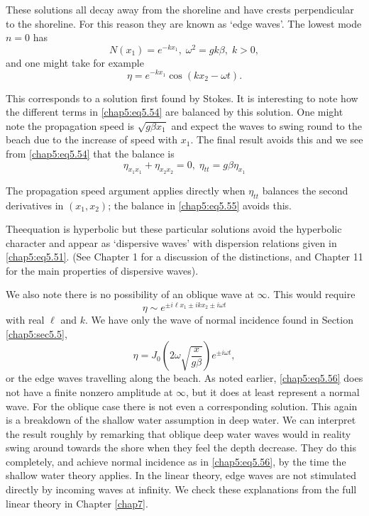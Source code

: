 These solutions all decay away from the shoreline and have crests perpendicular to the shoreline. For this reason they are known as `edge waves'. The lowest mode $n=0$ has 
$$
N(x_1)=e^{-kx_1},\;\omega^2=gk\beta,\;k>0,
$$
and one might take for example
\begin{equation}
\eta=e^{-kx_1}\cos\left(kx_2-\omega t\right).\tag{5.54}\label{chap5:eq5.54}
\end{equation}

This corresponds to a solution first found by Stokes. It is interesting to note how the different terms in \eqref{chap5:eq5.54} are balanced by this solution. One might note the propagation speed is $\sqrt{g\beta x_1}$ and expect the waves to swing round to the beach due to the increase of speed with $x_1$. The final result avoids this and we see from \eqref{chap5:eq5.54} that the balance is 
\begin{equation}
\eta_{x_1x_1}+\eta_{x_2x_2}=0,\;\eta_{tt}=g\beta\eta_{x_1} \tag{5.55}\label{chap5:eq5.55}
\end{equation}

The propagation speed argument applies directly when $\eta_{tt}$ balances the second derivatives in $(x_1,x_2)$; the balance in \eqref{chap5:eq5.55} avoids this.

The\pageoriginale equation is hyperbolic but these particular solutions avoid the hyperbolic character and appear as `dispersive waves' with dispersion relations given in \eqref{chap5:eq5.51}. (See \cite{key1} Chapter 1 for a discussion of the distinctions, and Chapter 11 for the main properties of dispersive waves).

We also note there is no possibility of an oblique wave at $\infty$. This would require
$$
\eta\sim e^{\pm i\ell x_1\pm ikx_2\pm i\omega t}
$$
with real $\ell$ and $k$. We have only the wave of normal incidence found in Section \ref{chap5:sec5.5},
\begin{equation}
\eta=J_0\left(2\omega \sqrt{\frac{x}{g\beta}}\right)e^{\pm i\omega t}, \tag{5.56}\label{chap5:eq5.56}
\end{equation}
or the edge waves travelling along the beach. As noted earlier, \eqref{chap5:eq5.56} does not have a finite nonzero amplitude at $\infty$, but it does at least represent a normal wave. For the oblique case there is not even a corresponding solution. This again is a breakdown of the shallow water assumption in deep water. We can interpret the result roughly by remarking that oblique deep water waves would in reality swing around towards the shore when they feel the depth decrease. They do this completely, and achieve normal incidence as in \eqref{chap5:eq5.56}, by the time the shallow water theory applies. In the linear theory, edge waves are not stimulated directly by incoming waves at infinity. We check these explanations from the full linear theory in Chapter \ref{chap7}. 

